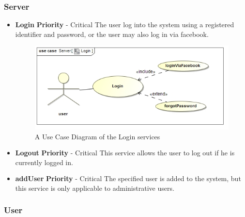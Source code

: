 \documentclass{article}
\begin{document}
		\subsubsection{Server}
			\begin{itemize}
			\item \textbf{Login}
				\newline\textbf{ Priority } - Critical
				\newline The user log into the system using a registered identifier and password, or the user may also log in via facebook.
	
		\begin{figure}[H]	
 			 \centering
			  \includegraphics[width=12cm]{LoginUseCase}
		 	 \caption{A Use Case Diagram of the Login services}
		\end{figure}
	
		\item \textbf{Logout}
				\newline\textbf{ Priority } - Critical
				\newline This service allows the user to log out if he is currently logged in.
			\item \textbf{addUser}
				\newline\textbf{ Priority } - Critical
				\newline The specified user is added to the system, but this service is only applicable to administrative users. 
			\end{itemize}
		\subsubsection{User}
\end{document}
